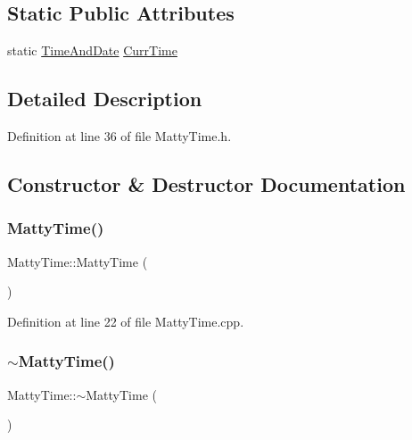 \subsection*{Static Public Attributes}
\begin{DoxyCompactItemize}
\item 
static \hyperlink{structTimeAndDate}{Time\+And\+Date} \hyperlink{classMattyTime_a458337456f43243073ae78976e86618f}{Curr\+Time}
\end{DoxyCompactItemize}


\subsection{Detailed Description}


Definition at line 36 of file Matty\+Time.\+h.



\subsection{Constructor \& Destructor Documentation}
\hypertarget{classMattyTime_aebf245aa0b578982cad3f679ea5348cd}{}\label{classMattyTime_aebf245aa0b578982cad3f679ea5348cd} 
\subsubsection{\texorpdfstring{Matty\+Time()}{MattyTime()}}
{\footnotesize\ttfamily Matty\+Time\+::\+Matty\+Time (\begin{DoxyParamCaption}{ }\end{DoxyParamCaption})}



Definition at line 22 of file Matty\+Time.\+cpp.

\hypertarget{classMattyTime_acb302c8f6c5215dc974f87753ed2fd61}{}\label{classMattyTime_acb302c8f6c5215dc974f87753ed2fd61} 
\subsubsection{\texorpdfstring{$\sim$\+Matty\+Time()}{~MattyTime()}}
{\footnotesize\ttfamily Matty\+Time\+::$\sim$\+Matty\+Time (\begin{DoxyParamCaption}{ }\end{DoxyParamCaption})}



